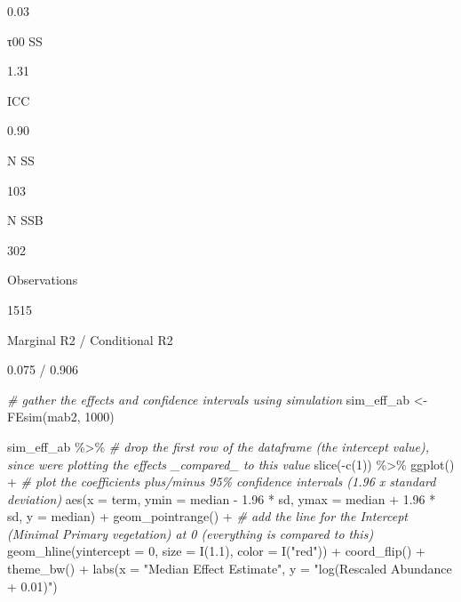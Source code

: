\documentclass[
]{article}
\newenvironment{Shaded}{\begin{snugshade}}{\end{snugshade}}
\newcommand{\AttributeTok}[1]{\textcolor[rgb]{0.77,0.63,0.00}{#1}}
\newcommand{\CommentTok}[1]{\textcolor[rgb]{0.56,0.35,0.01}{\textit{#1}}}
\newcommand{\DecValTok}[1]{\textcolor[rgb]{0.00,0.00,0.81}{#1}}
\newcommand{\FloatTok}[1]{\textcolor[rgb]{0.00,0.00,0.81}{#1}}
\newcommand{\FunctionTok}[1]{\textcolor[rgb]{0.00,0.00,0.00}{#1}}
\newcommand{\NormalTok}[1]{#1}
\newcommand{\OtherTok}[1]{\textcolor[rgb]{0.56,0.35,0.01}{#1}}
\newcommand{\SpecialCharTok}[1]{\textcolor[rgb]{0.00,0.00,0.00}{#1}}
\newcommand{\StringTok}[1]{\textcolor[rgb]{0.31,0.60,0.02}{#1}}
\begin{document}
0.03

τ00 SS

1.31

ICC

0.90

N SS

103

N SSB

302

Observations

1515

Marginal R2 / Conditional R2

0.075 / 0.906

\begin{Shaded}
\begin{Highlighting}[]
\CommentTok{\# gather the effects and confidence intervals using simulation}
\NormalTok{sim\_eff\_ab }\OtherTok{\textless{}{-}} \FunctionTok{FEsim}\NormalTok{(mab2, }\DecValTok{1000}\NormalTok{)}

\NormalTok{sim\_eff\_ab }\SpecialCharTok{\%\textgreater{}\%}
  \CommentTok{\# drop the first row of the dataframe (the intercept value), since we\textquotesingle{}re plotting the effects \_compared\_ to this value}
  \FunctionTok{slice}\NormalTok{(}\SpecialCharTok{{-}}\FunctionTok{c}\NormalTok{(}\DecValTok{1}\NormalTok{)) }\SpecialCharTok{\%\textgreater{}\%}
  \FunctionTok{ggplot}\NormalTok{() }\SpecialCharTok{+}
  \CommentTok{\# plot the coefficients plus/minus 95\% confidence intervals (1.96 x standard deviation)}
  \FunctionTok{aes}\NormalTok{(}\AttributeTok{x =}\NormalTok{ term, }\AttributeTok{ymin =}\NormalTok{ median }\SpecialCharTok{{-}} \FloatTok{1.96} \SpecialCharTok{*}\NormalTok{ sd,}
      \AttributeTok{ymax =}\NormalTok{ median }\SpecialCharTok{+} \FloatTok{1.96} \SpecialCharTok{*}\NormalTok{ sd, }\AttributeTok{y =}\NormalTok{ median) }\SpecialCharTok{+}
  \FunctionTok{geom\_pointrange}\NormalTok{() }\SpecialCharTok{+}
  \CommentTok{\# add the line for the Intercept (Minimal Primary vegetation) at 0 (everything is compared to this)}
  \FunctionTok{geom\_hline}\NormalTok{(}\AttributeTok{yintercept =} \DecValTok{0}\NormalTok{, }\AttributeTok{size =} \FunctionTok{I}\NormalTok{(}\FloatTok{1.1}\NormalTok{), }\AttributeTok{color =} \FunctionTok{I}\NormalTok{(}\StringTok{"red"}\NormalTok{)) }\SpecialCharTok{+}
  \FunctionTok{coord\_flip}\NormalTok{() }\SpecialCharTok{+}
  \FunctionTok{theme\_bw}\NormalTok{() }\SpecialCharTok{+} \FunctionTok{labs}\NormalTok{(}\AttributeTok{x =} \StringTok{"Median Effect Estimate"}\NormalTok{, }\AttributeTok{y =} \StringTok{"log(Rescaled Abundance + 0.01)"}\NormalTok{)}
\end{Highlighting}
\end{Shaded}
\end{document}
